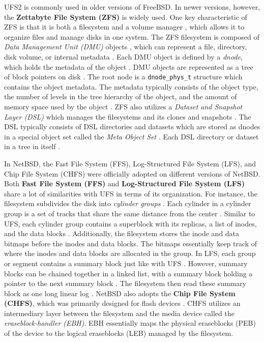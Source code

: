 UFS2 is commonly used in older versions of FreeBSD. In newer versions, however, the \textbf{Zettabyte File System (ZFS)}
is widely used. One key characteristic of ZFS is that it is both a filesystem and a volume manager \parencite{freebsd_zfs},
which allows it to organize files and manage disks in one system.
The ZFS filesystem is composed of \textit{Data Management Unit (DMU)} objects \parencite{siebenmann2018},
which can represent a file, directory, disk volume, or internal metadata \parencite{openzfs_docs_dnode}. Each DMU object
is defined by a \textit{dnode}, which holds the metadata of the object \parencite{openzfs_docs_dnode}. DMU objects are represented
as a tree of block pointers on disk \parencite{openzfs_docs_dnode}. The root node is a \texttt{dnode\_phys\_t} structure
which contains the object metadata. The metadata typically consists of the object type, the number of levels in the
tree hierarchy of the object, and the amount of memory space used by the object \parencite{openzfs_docs_dnode}.
ZFS also utilizes a \textit{Dataset and Snapshot Layer (DSL)} which manages the filesystems and its clones and snapshots
\parencite{openzfs_docs_dnode}. The DSL typically consists of DSL directories and datasets which are stored as dnodes
in a special object set called the \textit{Meta Object Set} \parencite{openzfs_docs_dnode}. Each DSL directory or dataset
in a tree in itself \parencite{openzfs_docs_dnode}.

In NetBSD, the Fast File System (FFS), Log-Structured File System (LFS), and Chip File System (CHFS) were officially adopted
on different versions of NetBSD.
Both \textbf{Fast File System (FFS)} and \textbf{Log-Structured File System (LFS)} share a lot of similarities with UFS in
terms of its organization. For instance, the filesystem subdivides the disk into \textit{cylinder groups}
\parencite{arpaci_dusseau2023}. Each cylinder in a cylinder group is a set of tracks that share the same distance
from the center \parencite{arpaci_dusseau2023}. Similar to UFS, each cylinder group contains a superblock with its
replicas, a list of inodes, and the data blocks \parencite{arpaci_dusseau2023}. Additionally, the filesystem stores
the inode and data bitmaps before the inodes and data blocks. The bitmaps essentially keep track of where the inodes
and data blocks are allocated in the group. In LFS, each group or segment contains a summary block just like with UFS
\parencite{rosenblum1991}. However, summary blocks can be chained together in a linked list, with a summary block
holding a pointer to the next summary block \parencite{rosenblum1991}. The filesystem then read these summary block
as one long linear log \parencite{rosenblum1991}. NetBSD also adopts the \textbf{Chip File System (CHFS)},
which was primarily designed for flash devices \parencite{chfs_about2018}. CHFS utilizes an intermediary layer between
the filesystem and the media device called the \textit{eraseblock-handler (EBH)}. EBH essentially maps the physical eraseblocks
(PEB) of the device to the logical eraseblocks (LEB) managed by the filesystem.

